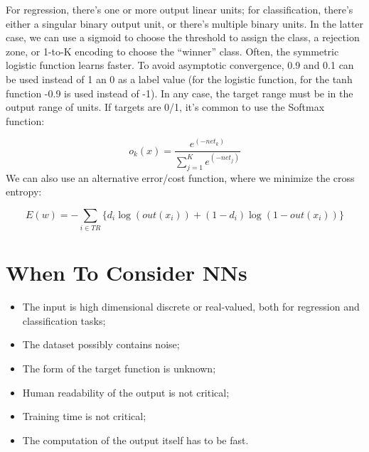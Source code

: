 For regression, there's one or more output linear units; for classification, there's either a singular binary output unit, or there's multiple binary units. In the latter case, we can use a sigmoid to choose the threshold to assign the class, a rejection zone, or 1-to-K encoding to choose the ``winner'' class. Often, the symmetric logistic function learns faster. To avoid asymptotic convergence, 0.9 and 0.1 can be used instead of 1 an 0 as a label value (for the logistic function, for the tanh function -0.9 is used instead of -1). In any case, the target range must be in the output range of units. If targets are 0/1, it's common to use the Softmax function:

\begin{equation*}
    o_k(x) = \dfrac{e^{(-net_k)}}{\sum_{j=1}^Ke^{(-net_j)}}
\end{equation*}
We can also use an alternative error/cost function, where we minimize the cross entropy:

\begin{equation*}
   E(w) = - \sum_{i \in TR} \{ d_i \log (out(x_i)) + (1-d_i) \log(1-out(x_i)) \}
\end{equation*}

\section{When To Consider NNs}

\begin{itemize}
    \item The input is high dimensional discrete or real-valued, both for regression and classification tasks;

    \item The dataset possibly contains noise;

    \item The form of the target function is unknown;

    \item Human readability of the output is not critical;

    \item Training time is not critical;
    
    \item The computation of the output itself has to be fast.
\end{itemize}
